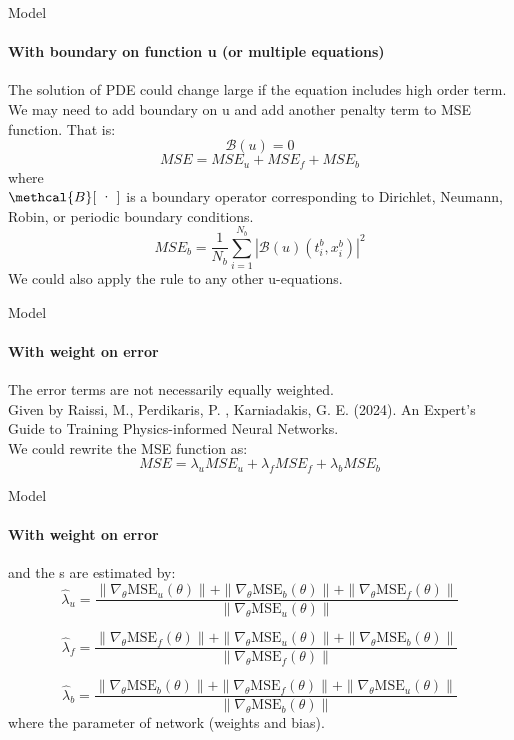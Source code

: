 \begin{frame}{Model}
\framesubtitle{With boundary on function u (or multiple equations)}
    The solution of PDE could change large if the equation includes high order term.\\
    We may need to add boundary on u and add another penalty term to MSE function. That is:
    \begin{equation}
    \mathcal{B}(u) = 0
    \end{equation}
    \begin{equation}
    MSE = MSE_u + MSE_f + MSE_b
    \end{equation}
    where\\
    \( \methcal{B}[\text{ · }]\) is a boundary operator corresponding to Dirichlet, Neumann, Robin, or periodic boundary conditions. 
    \begin{equation}
    MSE_b = \frac{1}{N_b} \sum_{i=1}^{N_b} | \mathcal{B}(u)(t_i^b, x_i^b) |^2
    \end{equation}
    We could also apply the rule to any other u-equations.
\end{frame}
\begin{frame}{Model}
\framesubtitle{With weight on error}
    The error terms are not necessarily equally weighted.\\
    Given by Raissi, M., Perdikaris, P. , Karniadakis, G. E. (2024).
    An Expert’s Guide to Training Physics-informed Neural Networks.\\
    We could rewrite the MSE function as:
    \begin{equation}
    MSE = \lambda_u MSE_u + \lambda_f MSE_f + \lambda_b MSE_b
    \end{equation}
\end{frame}

\begin{frame}{Model}
\framesubtitle{With weight on error}
    and the \lambda s are estimated by:
    \begin{equation}
    \hat{\lambda}_u = \frac{\| \nabla_{\theta} \text{MSE}_u (\theta) \| + \| \nabla_{\theta} \text{MSE}_b (\theta) \| + \| \nabla_{\theta} \text{MSE}_f (\theta) \|}{\| \nabla_{\theta} \text{MSE}_u (\theta) \|}
    \end{equation}

    \begin{equation}
    \hat{\lambda}_f = \frac{\| \nabla_{\theta} \text{MSE}_f (\theta) \| + \| \nabla_{\theta} \text{MSE}_u (\theta) \| + \| \nabla_{\theta} \text{MSE}_b (\theta) \|}{\| \nabla_{\theta} \text{MSE}_f (\theta) \|}
    \end{equation}

    \begin{equation}
    \hat{\lambda}_b = \frac{\| \nabla_{\theta} \text{MSE}_b (\theta) \| + \| \nabla_{\theta} \text{MSE}_f (\theta) \| + \| \nabla_{\theta} \text{MSE}_u (\theta) \|}{\| \nabla_{\theta} \text{MSE}_b (\theta) \|}
    \end{equation}
    where \theta {} the parameter of network (weights and bias).
\end{frame}

